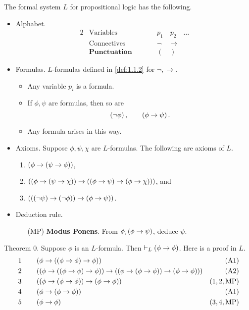 \begin{definition}
The formal system $ L $ for propositional logic has the following.
\begin{itemize}
\item Alphabet.
\begin{alignat*}{2}
& \text{Variables} & \qquad & p_1 \quad p_2 \quad \dots \\
& \text{Connectives} & \qquad & \neg \quad \rightarrow \\
& \textbf{Punctuation} & \qquad & ( \quad )
\end{alignat*}
\item Formulas. $ L $-formulas defined in \ref{def:1.1.2} for $ \neg, \rightarrow $.
\begin{itemize}
\item Any variable $ p_i $ is a formula.
\item If $ \phi, \psi $ are formulas, then so are
$$ \left( \neg \phi \right), \qquad \left( \phi \rightarrow \psi \right). $$
\item Any formula arises in this way.
\end{itemize}
\item Axioms. Suppose $ \phi, \psi, \chi $ are $ L $-formulas. The following are axioms of $ L $.
\begin{enumerate}[label=(A\arabic*)]
\item $ \left( \phi \rightarrow \left( \psi \rightarrow \phi \right) \right) $,
\item $ \left( \left( \phi \rightarrow \left( \psi \rightarrow \chi \right) \right) \rightarrow \left( \left( \phi \rightarrow \psi \right) \rightarrow \left( \phi \rightarrow \chi \right) \right) \right) $, and
\item $ \left( \left( \left( \neg \psi \right) \rightarrow \left( \neg \phi \right) \right) \rightarrow \left( \phi \rightarrow \psi \right) \right) $.
\end{enumerate}
\item Deduction rule.
\begin{itemize}
\item[(MP)] \textbf{Modus Ponens}. From $ \phi, \left( \phi \rightarrow \psi \right) $, deduce $ \psi $.
\end{itemize}
\end{itemize}
\end{definition}

\begin{example1}
\label{eg:1.2.3}
Theorem $ 0 $. Suppose $ \phi $ is an $ L $-formula. Then $ \vdash_L \left( \phi \rightarrow \phi \right) $. Here is a proof in $ L $.
\begin{align*}
1 \qquad & \left( \phi \rightarrow \left( \left( \phi \rightarrow \phi \right) \rightarrow \phi \right) \right) & \left( \text{A1} \right) \\
2 \qquad & \left( \left( \phi \rightarrow \left( \left( \phi \rightarrow \phi \right) \rightarrow \phi \right) \right) \rightarrow \left( \left( \phi \rightarrow \left( \phi \rightarrow \phi \right) \right) \rightarrow \left( \phi \rightarrow \phi \right) \right) \right) & \left( \text{A2} \right) \\
3 \qquad & \left( \left( \phi \rightarrow \left( \phi \rightarrow \phi \right) \right) \rightarrow \left( \phi \rightarrow \phi \right) \right) & \left( 1, 2, \text{MP} \right) \\
4 \qquad & \left( \phi \rightarrow \left( \phi \rightarrow \phi \right) \right) & \left( \text{A1} \right) \\
5 \qquad & \left( \phi \rightarrow \phi \right) & \left( 3, 4, \text{MP} \right)
\end{align*}
\end{example1}

